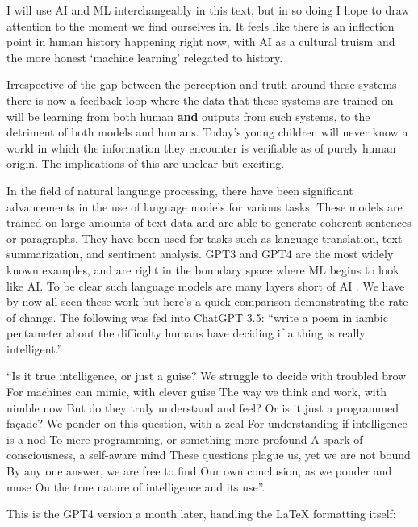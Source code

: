 I will use AI and ML interchangeably in this text, but in so doing I hope to draw attention to the moment we find ourselves in. It feels like there is an inflection point in human history happening right now, with AI as a cultural truism and the more honest `machine learning' relegated to history. \par
Irrespective of the gap between the perception and truth around these systems there is now a feedback loop where the data that these systems are trained on will be learning from both human \textbf{and} outputs from such systems, to the detriment of both models and humans\cite{shumailov2023curse}. Today's young children will never know a world in which the information they encounter is verifiable as of purely human origin. The implications of this are unclear but exciting. \par
In the field of natural language processing, there have been significant advancements in the use of language models for various tasks. These models are trained on large amounts of text data and are able to generate coherent sentences or paragraphs. They have been used for tasks such as language translation, text summarization, and sentiment analysis. GPT3 and GPT4 are the most widely known examples, and are right in the boundary space where ML begins to look like AI. To be clear such language models are many layers short of AI \cite{elkins2020can, marcus2020gpt}. We have by now all seen these work but here's a quick comparison demonstrating the rate of change. The following was fed into ChatGPT 3.5: ``write a poem in iambic pentameter about the difficulty humans have deciding if a thing is really intelligent.''
\newpage
\begin{tcolorbox}[enhanced, frame style={fill=lightgray}, interior style={fill=lightgray}]``Is it true intelligence, or just a guise?
We struggle to decide with troubled brow
For machines can mimic, with clever guise
The way we think and work, with nimble now
But do they truly understand and feel?
Or is it just a programmed façade?
We ponder on this question, with a zeal
For understanding if intelligence is a nod
To mere programming, or something more profound
A spark of consciousness, a self-aware mind
These questions plague us, yet we are not bound
By any one answer, we are free to find
Our own conclusion, as we ponder and muse
On the true nature of intelligence and its use''.
\end{tcolorbox}

This is the GPT4 version a month later, handling the LaTeX formatting itself:\\

